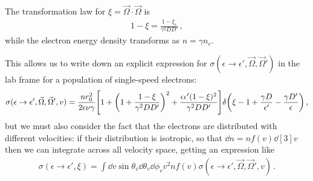 \documentclass[main.tex]{subfiles}
\begin{document}
The transformation law for \(\xi = \vec{\Omega} \cdot \vec{\Omega}\) is 
%
\begin{align}
1 - \xi = \frac{1 - \xi _e}{\gamma^2 D D'}
\,,
\end{align}
%
while the electron energy density transforms as \(n = \gamma n_e\). 

This allows us to write down an explicit expression for \(\sigma (\epsilon \to \epsilon ', \vec{\Omega}, \vec{\Omega}')\) in the lab frame for a population of single-speed electrons:
%
\begin{align}
\sigma (\epsilon \to \epsilon ', \vec{\Omega}, \vec{\Omega}', v) 
= 
\frac{n r_0^2}{2 \epsilon \nu \gamma } 
\qty[1 + \qty(1 + \frac{1 - \xi }{\gamma^2 D D'})^2
+ \frac{\epsilon \epsilon ' (1 - \xi )^2}{\gamma^2 D D'}]
\delta \qty(\xi -1 + \frac{\gamma D}{\epsilon'} - \frac{\gamma D'}{\epsilon })
\,,
\end{align}
%
but we must also consider the fact that the electrons are distributed with different velocities: if their distribution is isotropic, so that \(\dd{n} = n f(v) \dd[3]{v}\) then we can integrate across all velocity space, getting an expression like 
%
\begin{align}
\sigma (\epsilon \to \epsilon ', \xi )
= \int \dd{v} \sin \theta_v \dd{\theta _v} \dd{\phi _v}
 v^2 n f(v) 
\sigma (\epsilon \to \epsilon ', \vec{\Omega}, \vec{\Omega}', v)  
\,.
\end{align}
\end{document}
